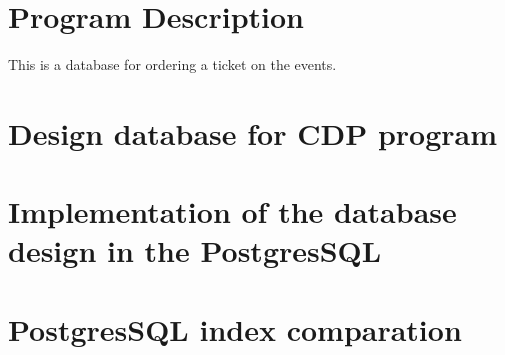 \documentclass[10pt]{article}
\begin{document}
    \maketitle
    \newpage

    \section{Program Description}\label{sec:program-description}
    This is a database for ordering a ticket on the events.

    \section{Design database for CDP program}\label{sec:database-design}
    

    \section{Implementation of the database design in the PostgresSQL}\label{sec:posgresql-implementation}
    

    \section{PostgresSQL index comparation}\label{sec:posgresql-index-comparation}
    
\end{document}
